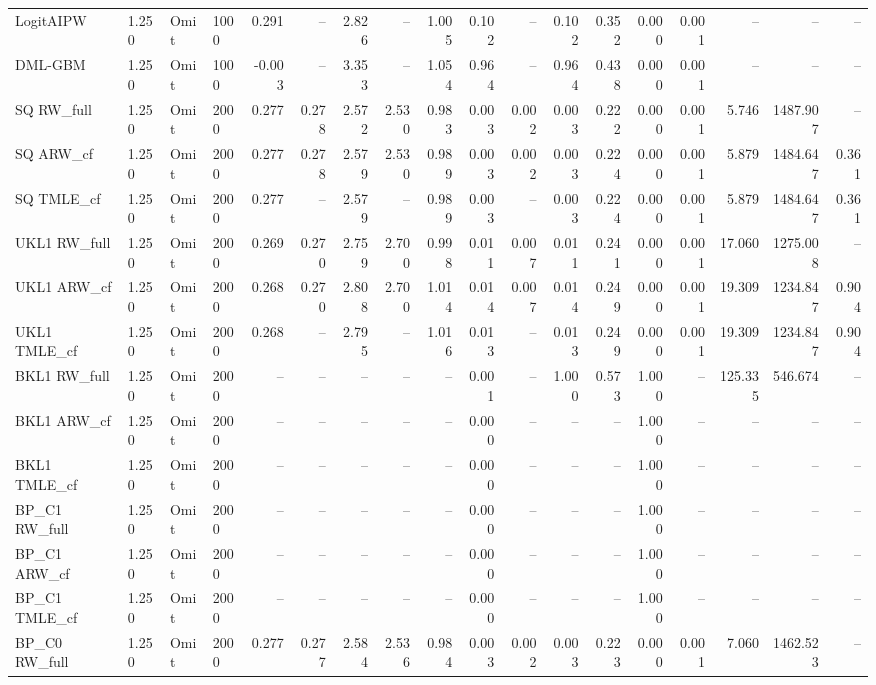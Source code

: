 \begin{tabular}{llllrrrrrrrrrrrrrr}
LogitAIPW & 1.250 & Omit & 1000 & 0.291 & -- & 2.826 & -- & 1.005 & 0.102 & -- & 0.102 & 0.352 & 0.000 & 0.001 & -- & -- & -- \\
DML-GBM & 1.250 & Omit & 1000 & -0.003 & -- & 3.353 & -- & 1.054 & 0.964 & -- & 0.964 & 0.438 & 0.000 & 0.001 & -- & -- & -- \\
SQ RW\_full & 1.250 & Omit & 2000 & 0.277 & 0.278 & 2.572 & 2.530 & 0.983 & 0.003 & 0.002 & 0.003 & 0.222 & 0.000 & 0.001 & 5.746 & 1487.907 & -- \\
SQ ARW\_cf & 1.250 & Omit & 2000 & 0.277 & 0.278 & 2.579 & 2.530 & 0.989 & 0.003 & 0.002 & 0.003 & 0.224 & 0.000 & 0.001 & 5.879 & 1484.647 & 0.361 \\
SQ TMLE\_cf & 1.250 & Omit & 2000 & 0.277 & -- & 2.579 & -- & 0.989 & 0.003 & -- & 0.003 & 0.224 & 0.000 & 0.001 & 5.879 & 1484.647 & 0.361 \\
UKL1 RW\_full & 1.250 & Omit & 2000 & 0.269 & 0.270 & 2.759 & 2.700 & 0.998 & 0.011 & 0.007 & 0.011 & 0.241 & 0.000 & 0.001 & 17.060 & 1275.008 & -- \\
UKL1 ARW\_cf & 1.250 & Omit & 2000 & 0.268 & 0.270 & 2.808 & 2.700 & 1.014 & 0.014 & 0.007 & 0.014 & 0.249 & 0.000 & 0.001 & 19.309 & 1234.847 & 0.904 \\
UKL1 TMLE\_cf & 1.250 & Omit & 2000 & 0.268 & -- & 2.795 & -- & 1.016 & 0.013 & -- & 0.013 & 0.249 & 0.000 & 0.001 & 19.309 & 1234.847 & 0.904 \\
BKL1 RW\_full & 1.250 & Omit & 2000 & -- & -- & -- & -- & -- & 0.001 & -- & 1.000 & 0.573 & 1.000 & -- & 125.335 & 546.674 & -- \\
BKL1 ARW\_cf & 1.250 & Omit & 2000 & -- & -- & -- & -- & -- & 0.000 & -- & -- & -- & 1.000 & -- & -- & -- & -- \\
BKL1 TMLE\_cf & 1.250 & Omit & 2000 & -- & -- & -- & -- & -- & 0.000 & -- & -- & -- & 1.000 & -- & -- & -- & -- \\
BP\_C1 RW\_full & 1.250 & Omit & 2000 & -- & -- & -- & -- & -- & 0.000 & -- & -- & -- & 1.000 & -- & -- & -- & -- \\
BP\_C1 ARW\_cf & 1.250 & Omit & 2000 & -- & -- & -- & -- & -- & 0.000 & -- & -- & -- & 1.000 & -- & -- & -- & -- \\
BP\_C1 TMLE\_cf & 1.250 & Omit & 2000 & -- & -- & -- & -- & -- & 0.000 & -- & -- & -- & 1.000 & -- & -- & -- & -- \\
BP\_C0 RW\_full & 1.250 & Omit & 2000 & 0.277 & 0.277 & 2.584 & 2.536 & 0.984 & 0.003 & 0.002 & 0.003 & 0.223 & 0.000 & 0.001 & 7.060 & 1462.523 & -- \\

\end{tabular}
